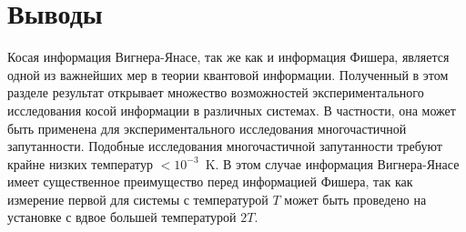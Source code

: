 \section{Выводы}
Косая информация Вигнера-Янасе, так же как и информация Фишера,
является одной из важнейших мер в теории квантовой информации.
Полученный в этом разделе результат открывает множество возможностей
экспериментального исследования косой информации в различных системах.
В частности, она может быть применена для экспериментального исследования многочастичной запутанности.
Подобные исследования многочастичной запутанности требуют крайне низких температур $<10^{-3}$~K.
В этом случае информация Вигнера-Янасе имеет существенное преимущество перед информацией Фишера,
так как измерение первой для системы с температурой $T$
может быть проведено на установке с вдвое большей температурой $2T$.